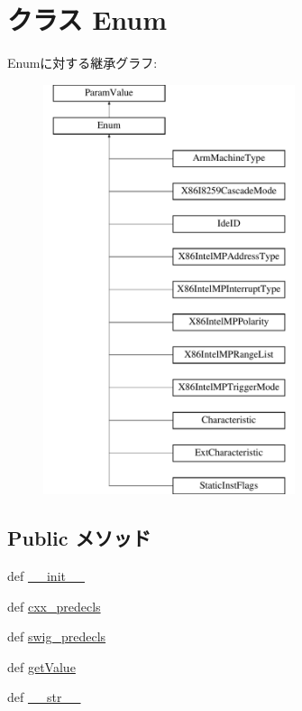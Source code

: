 \hypertarget{classm5_1_1params_1_1Enum}{
\section{クラス Enum}
\label{classm5_1_1params_1_1Enum}
}
Enumに対する継承グラフ:\begin{figure}[H]
\begin{center}
\leavevmode
\includegraphics[height=12cm]{classm5_1_1params_1_1Enum}
\end{center}
\end{figure}
\subsection*{Public メソッド}
\begin{DoxyCompactItemize}
\item 
def \hyperlink{classm5_1_1params_1_1Enum_ac775ee34451fdfa742b318538164070e}{\_\-\_\-init\_\-\_\-}
\item 
def \hyperlink{classm5_1_1params_1_1Enum_a0b408a11a14bd1d770e28f71a6e14ab5}{cxx\_\-predecls}
\item 
def \hyperlink{classm5_1_1params_1_1Enum_ab3dbcf5716623eac67a8ccc074fa7e13}{swig\_\-predecls}
\item 
def \hyperlink{classm5_1_1params_1_1Enum_acc340fbd4335fa34f9d57fb454b28ed0}{getValue}
\item 
def \hyperlink{classm5_1_1params_1_1Enum_aa7a4b9bc0941308e362738503137460e}{\_\-\_\-str\_\-\_\-}
\end{DoxyCompactItemize}
